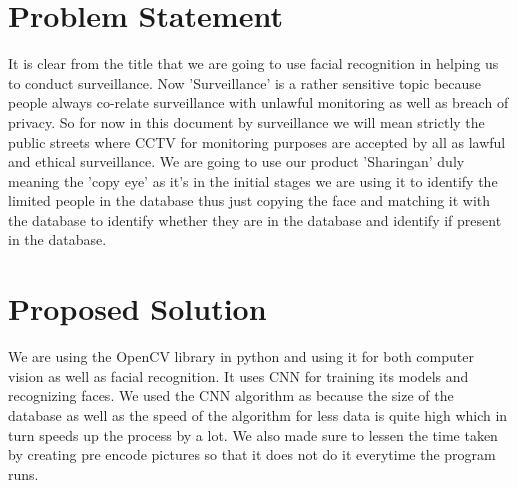 \documentclass[a4paper]{article}
\begin{document}
\section{Problem Statement}
\par It is clear from the title that we are going to use facial recognition in helping us to conduct surveillance. Now 'Surveillance' is a rather sensitive topic because people always co-relate surveillance with unlawful monitoring as well as breach of privacy. So for now in this document by surveillance we will mean strictly the public streets where CCTV for monitoring purposes are accepted by all as lawful and ethical surveillance. We are going to use our product  'Sharingan' duly meaning the 'copy eye' as it's in the initial stages we are using it to identify the limited people in the database thus just copying the face and matching it with the database to identify whether they are in the database and identify if present in the database.
\clearpage
\section{Proposed Solution}
We are using the OpenCV library in python and using it for both computer vision as well as facial recognition. It uses CNN for training its models and recognizing faces. We used the CNN algorithm as because the size of the database as well as the speed of the algorithm for less data is quite high which in turn speeds up the process by a lot. We also made sure to lessen the time taken by creating pre encode pictures so that it does not do it everytime the program runs. 
\par 
\clearpage
\end{document}
